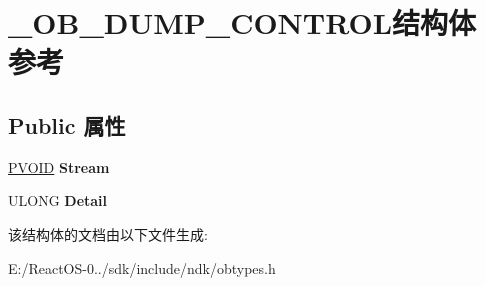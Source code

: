 \hypertarget{struct___o_b___d_u_m_p___c_o_n_t_r_o_l}{}\section{\+\_\+\+O\+B\+\_\+\+D\+U\+M\+P\+\_\+\+C\+O\+N\+T\+R\+O\+L结构体 参考}
\label{struct___o_b___d_u_m_p___c_o_n_t_r_o_l}
\subsection*{Public 属性}
\begin{DoxyCompactItemize}
\item 
\mbox{\label{struct___o_b___d_u_m_p___c_o_n_t_r_o_l_a816e32ac3f77238d69b0025154b7cf03}} 
\hyperlink{interfacevoid}{P\+V\+O\+ID} {\bfseries Stream}
\item 
\mbox{\label{struct___o_b___d_u_m_p___c_o_n_t_r_o_l_a1a431cf09e58ef0d32b0c2eac91dafd0}} 
U\+L\+O\+NG {\bfseries Detail}
\end{DoxyCompactItemize}


该结构体的文档由以下文件生成\+:\begin{DoxyCompactItemize}
\item 
E\+:/\+React\+O\+S-\/0../sdk/include/ndk/obtypes.\+h\end{DoxyCompactItemize}
